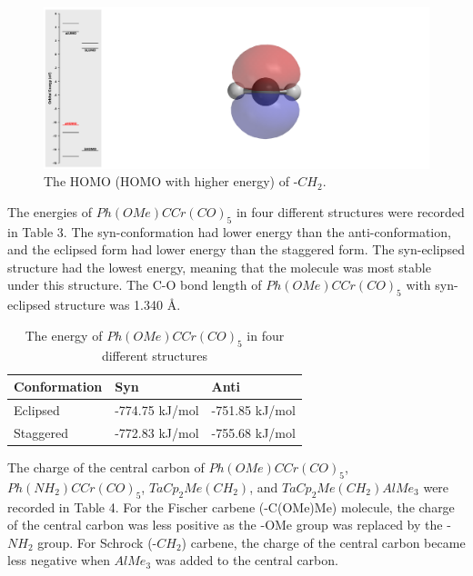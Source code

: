 \documentclass[twocolumn]{article} %
\begin{document}
\begin{figure}[h!]
      \centering
      \includegraphics[width=0.95\columnwidth]{CH2 HOMO.png} %
      \vspace{2mm} %
      \caption{The HOMO (HOMO with higher energy) of -$CH_2$.}
\end{figure}

The energies of $Ph(OMe)CCr(CO)_5$ in four different structures were recorded in Table 3. The syn-conformation had lower energy than the anti-conformation, and the eclipsed form had lower energy than the staggered form. The syn-eclipsed structure had the lowest energy, meaning that the molecule was most stable under this structure. The C-O bond length of $Ph(OMe)CCr(CO)_5$ with syn-eclipsed structure was 1.340 Å.

\begin{table}[h]
\caption{The energy of  $Ph(OMe)CCr(CO)_5$ in four different structures}
\begin{tabular}{L{1.0in}C{1.0in}C{1.0in}}\toprule
Conformation & Syn     & Anti    \\ \hline
Eclipsed     & -774.75 kJ/mol & -751.85 kJ/mol\\
Staggered    & -772.83 kJ/mol & -755.68 kJ/mol \\\bottomrule
\end{tabular}
\end{table}

The charge of the central carbon of $Ph(OMe)CCr(CO)_5$, $Ph(NH_2)CCr(CO)_5$, $TaCp_2Me(CH_2)$, and $TaCp_2Me(CH_2)AlMe_3$ were recorded in Table 4. For the Fischer carbene (-C(OMe)Me) molecule, the charge of the central carbon was less positive as the -OMe group was replaced by the -$NH_2$ group. For Schrock (-$CH_2$) carbene, the charge of the central carbon became less negative when $AlMe_3$ was added to the central carbon. 
\end{document}
